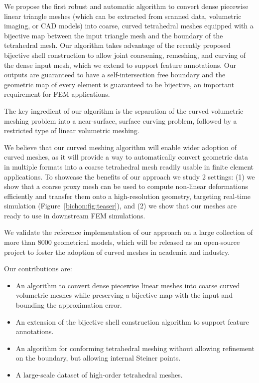 We propose the first robust and automatic algorithm to convert dense piecewise linear triangle meshes (which can be extracted from scanned data, volumetric imaging, or CAD models) into coarse, curved tetrahedral meshes equipped with a bijective map between the input triangle mesh and the boundary of the tetrahedral mesh. Our algorithm takes advantage of the recently proposed bijective shell construction \cite{jiang2020bijective} to allow joint coarsening, remeshing, and curving of the dense input mesh, which we extend to support feature annotations.
Our outputs are guaranteed to have a self-intersection free boundary and the geometric map of every element is guaranteed to be bijective, an important requirement for FEM applications.

The key ingredient of our algorithm is the separation of the curved volumetric meshing problem into a near-surface, surface curving problem, followed by a restricted type of linear volumetric meshing. 


We believe that our curved meshing algorithm will enable wider adoption of curved meshes, as it will provide a way to automatically convert geometric data in multiple formats into a coarse tetrahedral mesh readily usable in finite element applications. To showcase the benefits of our approach we study 2 settings: (1) we show that a coarse proxy mesh can be used to compute non-linear deformations efficiently and transfer them onto a high-resolution geometry, targeting real-time simulation (Figure~\ref{bichon:fig:teaser}), and (2) 
we show that our meshes are ready to use in downstream FEM simulations.

We validate the reference implementation of our approach on a large collection of more than 8000 geometrical models, which will be released as an open-source project to foster the adoption of curved meshes in academia and industry.

Our contributions are:
\begin{itemize}
    \item An algorithm to convert dense piecewise linear meshes into coarse curved volumetric meshes while preserving a bijective map with the input and bounding the approximation error.
    \item An extension of the bijective shell construction algorithm to support feature {annotations}.
    \item An algorithm for conforming tetrahedral meshing without allowing refinement on the boundary, but allowing internal Steiner points.
    \item A large-scale dataset of high-order tetrahedral meshes.
\end{itemize}